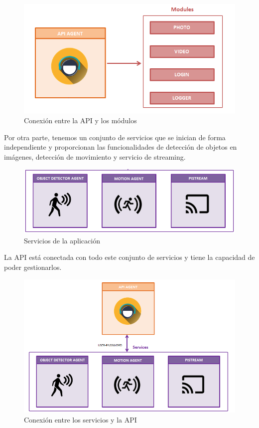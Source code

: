 \begin{figure}[h]
	\centering
	\includegraphics[scale=0.35]{images/27}
	\caption{Conexión entre la API y los módulos}
	\label{img:conexionapimodulos}
\end{figure}

Por otra parte, tenemos un conjunto de servicios que se inician de forma independiente y proporcionan las funcionalidades de detección de objetos en imágenes, detección de movimiento y servicio de streaming.

\begin{figure}[h]
	\centering
	\includegraphics[scale=0.35]{images/26}
	\caption{Servicios de la aplicación}
	\label{img:serviciosaplicacion}
\end{figure}

La API está conectada con todo este conjunto de servicios y tiene la capacidad de poder gestionarlos.

\begin{figure}[h]
	\centering
	\includegraphics[scale=0.35]{images/28}
	\caption{Conexión entre los servicios y la API}
	\label{img:conexionserviciosapi}
\end{figure}

